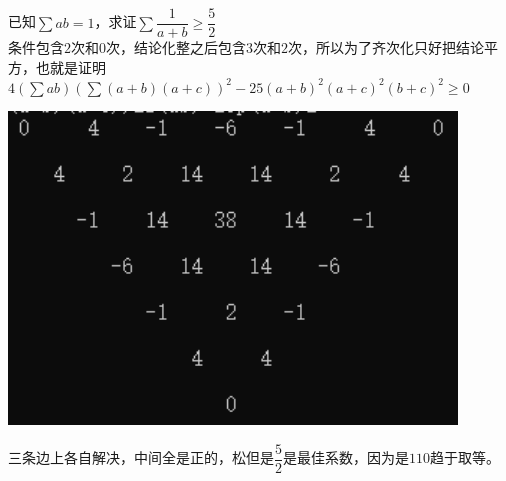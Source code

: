 \documentclass[UTF8]{ctexart}
\begin{document}
\subsection{}
已知$ \displaystyle \sum ab=1$，求证$ \displaystyle \sum \dfrac{1}{a+b}\geq \dfrac{5}{2}$\\
条件包含$ 2 $次和$ 0 $次，结论化整之后包含$ 3 $次和$ 2 $次，所以为了齐次化只好把结论平方，也就是证明$
4(\displaystyle \sum ab)(\displaystyle \sum (a+b)(a+c))^{2}-25(a+b)^{2}(a+c)^{2}(b+c)^{2}≥0 $
\begin{center}
	\includegraphics[width=0.5\linewidth]{a24}
\end{center}
三条边上各自解决，中间全是正的，松但是$ \dfrac{5}{2} $是最佳系数，因为是$ 110 $趋于取等。
\end{document}
